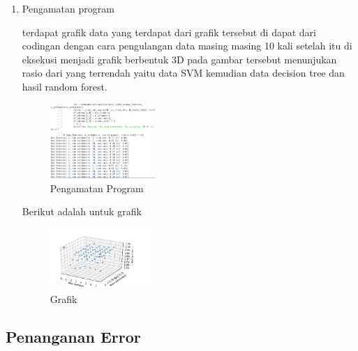 \begin{enumerate}
        \item Pengamatan program \hfill \break 
        
        terdapat grafik data yang terdapat dari grafik tersebut di dapat dari codingan dengan cara pengulangan data masing masing 10 kali setelah itu di eksekusi menjadi grafik berbentuk 3D pada gambar tersebut menunjukan rasio dari yang terrendah yaitu data SVM kemudian data decision tree dan hasil random forest.
        \begin{figure}[H]
            \includegraphics[width=4cm]{figures/1174040/chapter4/8.png}
            \centering
            \caption{Pengamatan Program}
        \end{figure}

        Berikut adalah untuk grafik \hfill \break 
        \begin{figure}[H]
            \includegraphics[width=4cm]{figures/1174040/chapter4/9.png}
            \centering
            \caption{Grafik}
        \end{figure}
    \end{enumerate}
    \subsection{Penanganan Error}
